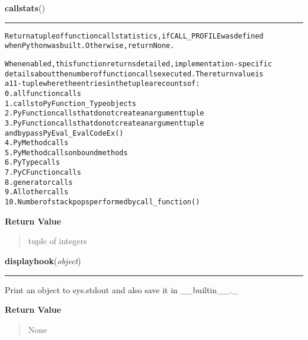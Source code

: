 \hspace{.8\funcindent}\begin{boxedminipage}{\funcwidth}

    \raggedright \textbf{callstats}()

    \vspace{-1.5ex}

    \rule{\textwidth}{0.5\fboxrule}
\setlength{\parskip}{2ex}
\begin{alltt}
Return a tuple of function call statistics, if CALL\_PROFILE was defined
when Python was built.  Otherwise, return None.

When enabled, this function returns detailed, implementation-specific
details about the number of function calls executed. The return value is
a 11-tuple where the entries in the tuple are counts of:
0. all function calls
1. calls to PyFunction\_Type objects
2. PyFunction calls that do not create an argument tuple
3. PyFunction calls that do not create an argument tuple
   and bypass PyEval\_EvalCodeEx()
4. PyMethod calls
5. PyMethod calls on bound methods
6. PyType calls
7. PyCFunction calls
8. generator calls
9. All other calls
10. Number of stack pops performed by call\_function()
\end{alltt}

\setlength{\parskip}{1ex}
      \textbf{Return Value}
    \vspace{-1ex}

      \begin{quote}
      tuple of integers

      \end{quote}

    \end{boxedminipage}

    \label{sys:displayhook}

    \vspace{0.5ex}

\hspace{.8\funcindent}\begin{boxedminipage}{\funcwidth}

    \raggedright \textbf{displayhook}(\textit{object})

    \vspace{-1.5ex}

    \rule{\textwidth}{0.5\fboxrule}
\setlength{\parskip}{2ex}
    Print an object to sys.stdout and also save it in \_\_builtin\_\_.\_

\setlength{\parskip}{1ex}
      \textbf{Return Value}
    \vspace{-1ex}

      \begin{quote}
      None

      \end{quote}

    \end{boxedminipage}

